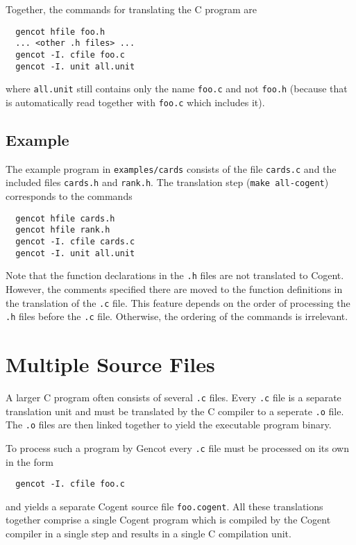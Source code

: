 \documentclass[a4paper]{report}
\newcommand{\code}[1]{\textnormal{\texttt{#1}}}
\begin{document}
Together, the commands for translating the C program are
\begin{verbatim}
  gencot hfile foo.h
  ... <other .h files> ...
  gencot -I. cfile foo.c
  gencot -I. unit all.unit
\end{verbatim}
where \code{all.unit} still contains only the name \code{foo.c} and not \code{foo.h} (because that is automatically
read together with \code{foo.c} which includes it).

\subsection{Example}

The example program in \code{examples/cards} consists of the file \code{cards.c} and the included files \code{cards.h}
and \code{rank.h}. The translation step (\code{make all-cogent}) corresponds to the commands
\begin{verbatim}
  gencot hfile cards.h
  gencot hfile rank.h
  gencot -I. cfile cards.c
  gencot -I. unit all.unit
\end{verbatim}

Note that the function declarations in the \code{.h} files are not translated to Cogent. However, the comments specified 
there are moved to the function definitions in the translation of the \code{.c} file. This feature depends on the order of
processing the \code{.h} files before the \code{.c} file. Otherwise, the ordering of the commands is irrelevant.

\section{Multiple Source Files}
\label{struct-multi}

A larger C program often consists of several \code{.c} files. Every \code{.c} file is a separate translation unit and
must be translated by the C compiler to a seperate \code{.o} file. The \code{.o} files are then linked together to
yield the executable program binary.

To process such a program by Gencot every \code{.c} file must be processed on its own in the form
\begin{verbatim}
  gencot -I. cfile foo.c
\end{verbatim}
and yields a separate Cogent source file \code{foo.cogent}. All these translations together comprise a single
Cogent program which is compiled by the Cogent compiler in a single step and results in a single C compilation unit.
\end{document}

